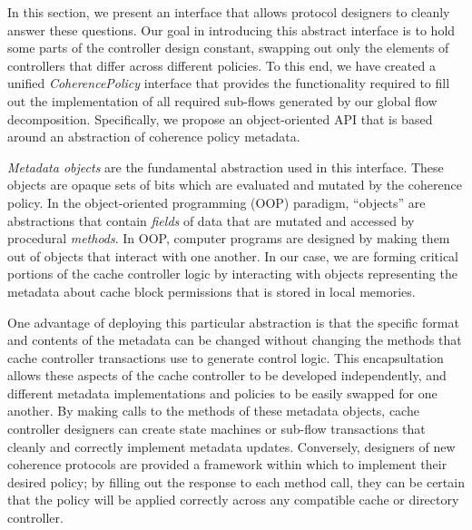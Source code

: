 In this section, we present an interface that allows protocol designers to cleanly answer these questions.
Our goal in introducing this abstract interface is to hold some parts of the controller design constant,
swapping out only the elements of controllers that differ across different policies.
To this end, we have created a unified \emph{CoherencePolicy} interface
that provides the functionality required to fill out the implementation of
all required sub-flows generated by our global flow decomposition.
Specifically, we propose an object-oriented API that is
based around an abstraction of coherence policy metadata.

\emph{Metadata objects} are the fundamental abstraction used in this interface.
These objects are opaque sets of bits which are evaluated and mutated by the coherence policy.
In the object-oriented programming (OOP) paradigm, ``objects'' are abstractions that contain \emph{fields} of data that are mutated and accessed by procedural \emph{methods}.
In OOP, computer programs are designed by making them out of objects that interact with one another.
In our case, we are forming critical portions of the cache controller logic by interacting with objects representing
the metadata about cache block permissions that is stored in local memories.

One advantage of deploying this particular abstraction is that
the specific format and contents of the metadata can be changed without changing the methods that cache controller transactions
use to generate control logic.
This encapsultation allows these aspects of the cache controller to be developed independently,
and different metadata implementations and policies to be easily swapped for one another.
By making calls to the methods of these metadata objects, cache controller designers can
create state machines or sub-flow transactions
that cleanly and correctly implement metadata updates. 
Conversely, designers of new coherence protocols are provided a framework
within which to implement their desired policy;
by filling out the response to each method call, they can be certain that the policy
will be applied correctly across any compatible cache or directory controller.

